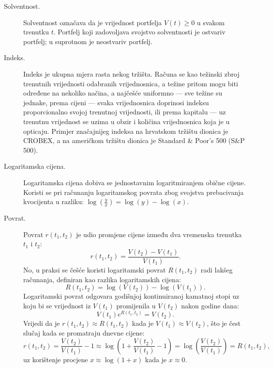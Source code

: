 \documentclass[lmodern, utf8, diplomski, numeric]{fer}
\newcommand{\q}{\left}
\newcommand{\w}{\right}
\begin{document}
\begin{description}
    \item[Solventnost.] Solventnost označava da je vrijednost portfelja $V\q(t\w) \ge 0$ u svakom trenutku $t$.
    Portfelj koji zadovoljava svojstvo solventnosti je ostvariv portfelj; u suprotnom je neostvariv portfelj.
    
    \item[Indeks.] Indeks je ukupna mjera rasta nekog tržišta.
    Računa se kao težinski zbroj trenutnih vrijednosti odabranih vrijednosnica, a težine pritom mogu biti određene na nekoliko načina, a najčešće uniformno --- sve težine su jednake, prema cijeni --- svaka vrijednosnica doprinosi indeksu proporcionalno svojoj trenutnoj vrijednosti, ili prema kapitalu --- uz trenutnu vrijednost se uzima u obzir i količina vrijednosnica koja je u opticaju.
    Primjer značajnijeg indeksa na hrvatskom tržištu dionica je CROBEX, a na američkom tržištu dionica je Standard \& Poor's 500 (S\&P 500).
    
    \item[Logaritamska cijena.] Logaritamska cijena dobiva se jednostavnim logaritmiranjem obične cijene.
      Koristi se pri računanju logaritamskog povrata zbog svojstva prebacivanja kvocijenta u razliku: $\log\q(\frac{y}{x}\w) = \log\q(y\w) - \log\q(x\w)$.
      
    \item[Povrat.]
      Povrat $r\q(t_1, t_2\w)$ je udio promjene cijene između dva vremenska trenutka $t_1$ i $t_2$:
      \begin{equation*}
        r\q(t_1, t_2\w) = \frac{V\q(t_2\w) - V\q(t_1\w)}{V\q(t_1\w)}.
      \end{equation*}
      No, u praksi se češće koristi logaritamski povrat $R\q(t_1, t_2\w)$ radi lakšeg računanja, definiran kao razlika logaritamskih cijena:
      \begin{equation*}
        R\q(t_1, t_2\w) = \log\q(V\q(t_2\w)\w) - \log\q(V\q(t_1\w)\w).
      \end{equation*}
      Logaritamski povrat odgovara godišnjoj kontinuiranoj kamatnoj stopi uz koju bi se vrijednost iz $V\q(t_1\w)$ promijenila u $V\q(t_2\w)$ nakon godine dana:
      \begin{equation*}
        V\q(t_1\w) e^{R\q(t_1, t_2\w)} = V\q(t_2\w).
      \end{equation*}
      Vrijedi da je $r\q(t_1, t_2\w) \approx R\q(t_1, t_2\w)$ kada je $V\q(t_1\w) \approx V\q(t_2\w)$, što je čest slučaj kada se promatraju dnevne cijene:
      \begin{equation*}
        r\q(t_1, t_2\w) = \frac{V\q(t_2\w)}{V\q(t_1\w)} - 1 \approx \log\q(1 + \frac{V\q(t_2\w)}{V\q(t_1\w)} - 1\w) = \log\q(\frac{V\q(t_2\w)}{V\q(t_1\w)}\w) = R\q(t_1, t_2\w),
      \end{equation*}
      uz korištenje procjene $x \approx \log\q(1 + x\w)$ kada je $x \approx 0$.
  \end{description}
  
\end{document}
